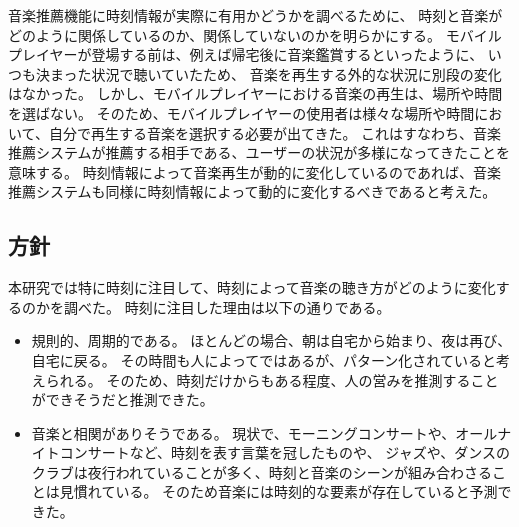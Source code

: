 \documentclass[a4paper, 11pt, onecolumn, report]{jsarticle}
\begin{document}

音楽推薦機能に時刻情報が実際に有用かどうかを調べるために、
時刻と音楽がどのように関係しているのか、関係していないのかを明らかにする。
モバイルプレイヤーが登場する前は、例えば帰宅後に音楽鑑賞するといったように、
いつも決まった状況で聴いていたため、
音楽を再生する外的な状況に別段の変化はなかった。
しかし、モバイルプレイヤーにおける音楽の再生は、場所や時間を選ばない。
そのため、モバイルプレイヤーの使用者は様々な場所や時間において、自分で再生する音楽を選択する必要が出てきた。
これはすなわち、音楽推薦システムが推薦する相手である、ユーザーの状況が多様になってきたことを意味する。
時刻情報によって音楽再生が動的に変化しているのであれば、音楽推薦システムも同様に時刻情報によって動的に変化するべきであると考えた。


\subsection{方針}
本研究では特に時刻に注目して、時刻によって音楽の聴き方がどのように変化するのかを調べた。
時刻に注目した理由は以下の通りである。
\begin{itemize}
\item
規則的、周期的である。
ほとんどの場合、朝は自宅から始まり、夜は再び、自宅に戻る。
その時間も人によってではあるが、パターン化されていると考えられる。
そのため、時刻だけからもある程度、人の営みを推測することができそうだと推測できた。
\item
音楽と相関がありそうである。
現状で、モーニングコンサートや、オールナイトコンサートなど、時刻を表す言葉を冠したものや、
ジャズや、ダンスのクラブは夜行われていることが多く、時刻と音楽のシーンが組み合わさることは見慣れている。
そのため音楽には時刻的な要素が存在していると予測できた。


\end{itemize}

\end{document}
